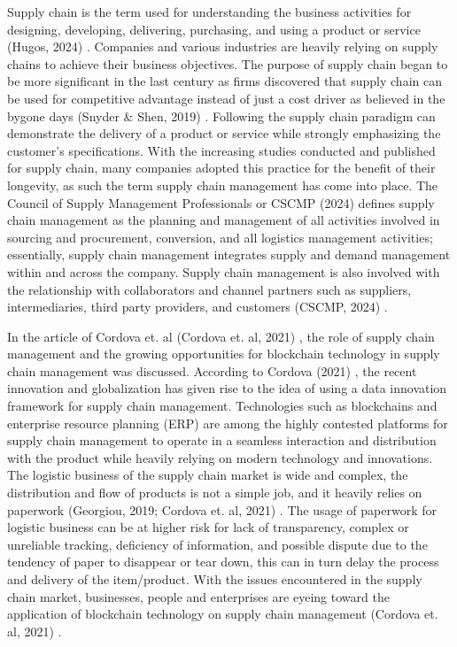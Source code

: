 Supply chain is the term used for understanding the business activities for designing, developing, delivering, purchasing, and using a product or service (Hugos, 2024) \nocite{rrl-OBTSCM2}. Companies and various industries are heavily relying on supply chains to achieve their business objectives. The purpose of supply chain began to be more significant in the last century as firms discovered that supply chain can be used for competitive advantage instead of just a cost driver as believed in the bygone days (Snyder \& Shen, 2019) \nocite{rrl-OBTSCM3}. Following the supply chain paradigm can demonstrate the delivery of a product or service while strongly emphasizing the customer’s specifications. With the increasing studies conducted and published for supply chain, many companies adopted this practice for the benefit of their longevity,  as such the term supply chain management has come into place. The Council of Supply Management Professionals or CSCMP (2024) defines supply chain management as the planning and management of all activities involved in sourcing and procurement, conversion, and all logistics management activities; essentially, supply chain management integrates supply and demand management within and across the company. Supply chain management is also involved with the relationship with collaborators and channel partners such as suppliers, intermediaries, third party providers, and customers (CSCMP, 2024) \nocite{rrl-OBTSCM4}.

In the article of Cordova et. al (Cordova et. al, 2021) \nocite{rrl-OBTSCM1}, the role of supply chain management and the growing opportunities for blockchain technology in supply chain management was discussed. According to Cordova (2021) \nocite{rrl-OBTSCM1}, the recent innovation and globalization has given rise to the idea of using a data innovation framework for supply chain management. Technologies such as blockchains and enterprise resource planning (ERP) are among the highly contested platforms for supply chain management to operate in a seamless interaction and distribution with the product while heavily relying on modern technology and innovations. The logistic business of the supply chain market is wide and complex, the distribution and flow of products is not a simple job, and it heavily relies on paperwork (Georgiou, 2019;  Cordova et. al, 2021) \nocite{rrl-OBTSCM1}. The usage of paperwork for logistic business can be at higher risk for lack of transparency, complex or unreliable tracking, deficiency of information, and possible dispute due to the tendency of paper to disappear or tear down, this can in turn delay the process and delivery of the item/product. With the issues encountered in the supply chain market, businesses, people and enterprises are eyeing toward the application of blockchain technology on supply chain management (Cordova et. al, 2021) \nocite{rrl-OBTSCM1}.

